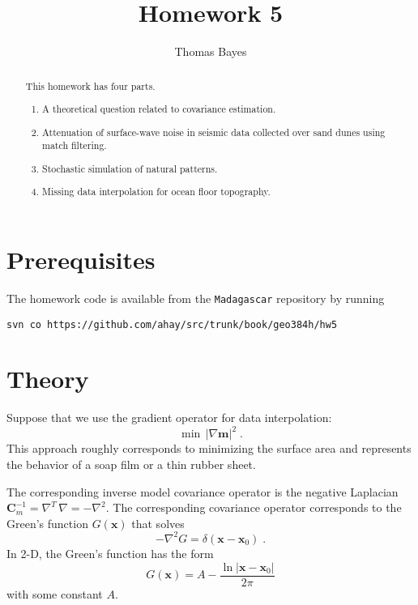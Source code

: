 \author{Thomas Bayes}
\title{Homework 5}

\begin{abstract}
  This homework has four parts. 
  \begin{enumerate}
    \item A theoretical question related to covariance estimation.
    \item Attenuation of surface-wave noise in 
        seismic data collected over sand dunes using match filtering.
    \item Stochastic simulation of natural patterns.
    \item Missing data interpolation for ocean floor topography.
  \end{enumerate}
\end{abstract}

\section{Prerequisites}

The homework code is available from the \texttt{Madagascar} repository
by running
\begin{verbatim}
svn co https://github.com/ahay/src/trunk/book/geo384h/hw5
\end{verbatim}

\section{Theory}

Suppose that we use the gradient operator for data interpolation:
\begin{equation}
\label{eq:grad}
\min\,\left|\nabla \mathbf{m}\right|^2\;.
\end{equation}  
This approach roughly corresponds to minimizing the surface area and
represents the behavior of a soap film or a thin rubber sheet.

The corresponding inverse model covariance operator is the negative Laplacian
$\mathbf{C}_m^{-1}=\nabla^T\,\nabla=-\nabla^2$. The corresponding
covariance operator corresponds to the Green's function $G(\mathbf{x})$ that solves
\begin{equation}
\label{eq:green}
-\nabla^2 G = \delta(\mathbf{x}-\mathbf{x}_0)\;.
\end{equation}
In 2-D, the Green's function has the form 
\begin{equation}
\label{eq:g2d}
G(\mathbf{x}) = \displaystyle A - \frac{\ln |\mathbf{x}-\mathbf{x}_0|}{2\pi}
\end{equation}
with some constant $A$.

